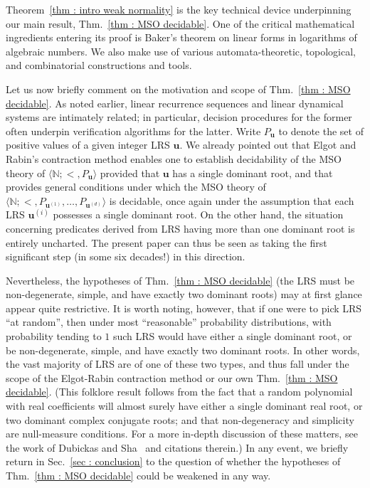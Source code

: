 \documentclass[a4paper,UKenglish,cleveref, autoref, thm-restate]{lipics-v2021}
\newcommand{\nat} {\mathbb{N}}
\begin{document}
Theorem~\ref{thm : intro weak normality} is the key technical device
underpinning our main result, Thm.~\ref{thm : MSO
  decidable}. One of the critical mathematical ingredients entering its
proof is Baker's theorem on linear forms in logarithms of algebraic
numbers. We also make use of various automata-theoretic, topological,
and combinatorial constructions and tools.

Let us now briefly comment on the motivation and scope of
Thm.~\ref{thm : MSO decidable}. As noted earlier, linear recurrence
sequences and linear dynamical systems are intimately related; in
particular, decision procedures for the former often underpin
verification algorithms for the latter. Write $P_{\boldsymbol{u}}$ to
denote the set of positive values of a given integer LRS $\boldsymbol{u}$.
We already pointed out that Elgot and Rabin's contraction method
enables one to establish decidability of the MSO theory of
$\langle \nat ; <,  P_{\boldsymbol{u}}\rangle$ provided that
$\boldsymbol{u}$ has a single dominant root, and that
\cite[Thm.~5.1]{berthe2024decidability} provides general conditions
under which the MSO theory of
$\langle \nat ; <,  P_{\boldsymbol{u}^{(1)}},\ldots, P_{\boldsymbol{u}^{(d)}}\rangle$
is decidable, once again under the assumption that each LRS
$\boldsymbol{u}^{(i)}$ possesses a single dominant root.
On the other hand, the situation concerning predicates derived from LRS having more than
one dominant  root is entirely uncharted. The present paper can thus
be seen as taking the first significant step (in some six decades!\@)
in this direction.

Nevertheless, the hypotheses of Thm.~\ref{thm : MSO decidable} (the
LRS must be non-degenerate, simple, and have exactly two dominant
roots) may at first glance appear quite restrictive. It is worth noting, however, that
if one were to pick LRS ``at random'', then under most ``reasonable''
probability distributions, with probability tending to $1$ such LRS
would have either a single dominant root, or be non-degenerate,
simple, and have exactly two dominant roots. In other words, the vast
majority of LRS are of one of these two types, and thus fall under the
scope of the Elgot-Rabin contraction method or our own Thm.~\ref{thm
  : MSO decidable}. (This folklore result follows from the fact that a
random polynomial with real coefficients will almost surely have
either a single dominant real root, or two dominant complex conjugate
roots; and that non-degeneracy and simplicity are null-measure
conditions. For a more in-depth discussion of these matters, see the work of Dubickas and
Sha~\cite{dubickas2016positive} and citations therein.) In any event,
we briefly return in Sec.~\ref{sec : conclusion} to the question of whether the hypotheses
of Thm.~\ref{thm : MSO decidable} could be weakened in any way.
\end{document}
